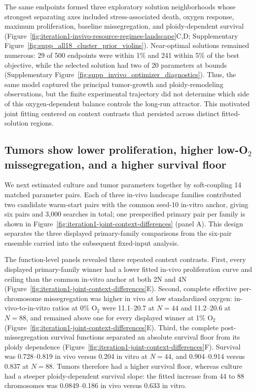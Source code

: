 \documentclass[11pt]{article}
\begin{document}
The same endpoints formed three exploratory solution neighborhoods whose strongest separating axes included stress-associated death, oxygen response, maximum proliferation, baseline missegregation, and ploidy-dependent survival (Figure~\ref{fig:iteration1-invivo-resource-regimes-landscape}C,D; Supplementary Figure~\ref{fig:supp_all18_cluster_prior_violins}). Near-optimal solutions remained numerous: 29 of 500 endpoints were within 1\% and 241 within 5\% of the best objective, while the selected solution had two of 20 parameters at bounds (Supplementary Figure~\ref{fig:supp_invivo_optimizer_diagnostics}). Thus, the same model captured the principal tumor-growth and ploidy-remodeling observations, but the finite experimental trajectory did not determine which side of this oxygen-dependent balance controls the long-run attractor. This motivated joint fitting centered on context contrasts that persisted across distinct fitted-solution regions.

\subsection*{Tumors show lower proliferation, higher low-O$_2$ missegregation, and a higher survival floor}

We next estimated culture and tumor parameters together by soft-coupling 14 matched parameter pairs. Each of three in-vivo landscape families contributed two candidate warm-start pairs with the common seed-10 in-vitro anchor, giving six pairs and 3,000 searches in total; one prespecified primary pair per family is shown in Figure~\ref{fig:iteration1-joint-context-differences} (panel A). This design separates the three displayed primary-family comparisons from the six-pair ensemble carried into the subsequent fixed-input analysis.

The function-level panels revealed three repeated context contrasts. First, every displayed primary-family winner had a lower fitted in-vivo proliferation curve and ceiling than the common in-vitro anchor at both 2N and 4N (Figure~\ref{fig:iteration1-joint-context-differences}E). Second, complete effective per-chromosome missegregation was higher in vivo at low standardized oxygen: in-vivo-to-in-vitro ratios at 0\% O$_2$ were 11.1--20.7 at \(N=44\) and 11.2--20.6 at \(N=88\), and remained above one for every displayed winner at 1\% O$_2$ (Figure~\ref{fig:iteration1-joint-context-differences}E). Third, the complete post-missegregation survival functions separated an absolute survival floor from its ploidy dependence (Figure~\ref{fig:iteration1-joint-context-differences}F). Survival was 0.728--0.819 in vivo versus 0.204 in vitro at \(N=44\), and 0.904--0.914 versus 0.837 at \(N=88\). Tumors therefore had a higher survival floor, whereas culture had a steeper ploidy-dependent survival slope: the fitted increase from 44 to 88 chromosomes was 0.0849--0.186 in vivo versus 0.633 in vitro.
\end{document}
